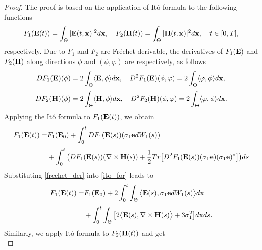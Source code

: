 \documentclass[10pt,a4paper]{amsart}
\begin{document}
\begin{proof}
The proof is based on the application of It\^o formula to the following functions
		\begin{equation*}
			F_1({\bf E}(t))=\int_\Theta|{\bf E}(t,{\bf x})|^2{\rm d}{\bf x},\quad F_2({\bf H}(t))=\int_\Theta|{\bf H}(t,{\bf x})|^2{\rm d}{\bf x},\quad t\in[0,T],
		\end{equation*} 
		respectively.
		Due to $F_1$ and $F_2$ are Fr\'echet derivable, the derivatives of $F_1({\bf E})$ and $F_2({\bf H})$ along directions $\phi$ and $(\phi,\varphi)$ are respectively, as follows 
		\begin{equation}\label{frechet_der}
			\begin{split}
				DF_1({\bf E})(\phi)&=2\int_\Theta\langle {\bf E},\phi\rangle{\rm d}{\bf x},\quad D^2F_1({\bf E})(\phi,\varphi)=2\int_\Theta\langle \varphi,\phi\rangle{\rm d}{\bf x},\\[1mm]
				DF_2({\bf H})(\phi)&=2\int_\Theta\langle {\bf H},\phi\rangle{\rm d}{\bf x},\quad D^2F_2({\bf H})(\phi,\varphi)=2\int_\Theta\langle \varphi,\phi\rangle{\rm d}{\bf x}.
			\end{split}
		\end{equation}
		Applying the It\^o formula to $F_1({\bf E}(t))$, we obtain
		\begin{equation}\label{ito_for}
			\begin{split}
				F_1({\bf E}(t))=&F_1({\bf E}_0)+\int_0^tDF_1({\bf E}(s))(\sigma_{1}{\bf{e}}{\rm d}W_1(s))\\[1mm]
				&+\int_0^t\big(DF_1({\bf E}(s))(\nabla\times {\bf H}(s))+\frac12{\rm Tr}\big[D^2F_1({\bf E}(s))(\sigma_{1}{\bf{e}})(\sigma_{1}{\bf{e}})^\ast\big]\big){\rm d}s
			\end{split}
		\end{equation}
		Substituting \eqref{frechet_der} into \eqref{ito_for} leads to
		\begin{equation}\label{ito_for_2}
			\begin{split}
				F_1({\bf E}(t))=&F_1({\bf E}_0)+2\int_0^t\int_\Theta\big\langle {\bf E}(s),\sigma_{1}{\bf{e}}{\rm d}W_1(s)\big\rangle {\rm d}{\bf x}\\[1mm]
				&+\int_0^t\int_\Theta\big[2\big\langle {\bf E}(s),\nabla\times {\bf H}(s)\big\rangle+3\sigma_{1}^2\big]{\rm d}{\bf x}{\rm d}s.
			\end{split}
		\end{equation}
		Similarly, we apply It\^o formula to $F_2({\bf H}(t))$ and get
		\begin{equation}\label{ito_for_3}

\end{equation}
\end{proof}
\end{document}
